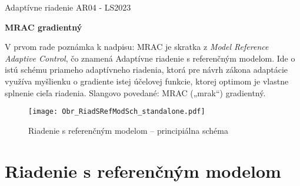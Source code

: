 \documentclass[a4paper, 10pt, ]{article}
\def\oznacenieCasti{AR04 - LS2023}
\begin{document}
\lstset{%
style=mystyle,
rangebeginprefix=\#\#\#\ cellB\ ,%
rangebeginsuffix=\ \#\#\#,%
rangeendprefix=\#\#\#\ cellE\ ,%
rangeendsuffix=\ \#\#\#,%
includerangemarker=false,
}





\fontsize{12pt}{22pt}\selectfont

\centerline{\textsf{Adaptívne riadenie} \hfill \textsf{\oznacenieCasti}}

\fontsize{18pt}{22pt}\selectfont





\begin{flushleft}
	\textbf{\textsf{MRAC gradientný}}
\end{flushleft}





\normalsize

\bigskip

{\hypersetup{hidelinks}

\tableofcontents

}

\bigskip

\vspace{18pt}






\noindent
V prvom rade poznámka k nadpisu: MRAC je skratka z \emph{Model Reference Adaptive Control}, čo znamená Adaptívne riadenie s referenčným modelom. Ide o istú schému priameho adaptívneho riadenia, ktorá pre návrh zákona adaptácie využíva myšlienku o gradiente istej účelovej funkcie, ktorej optimom je vlastne splnenie cieľa riadenia. Slangovo povedané: MRAC („mrak“) gradientný.








\begin{figure}[!b]
\centering

	\texttt{[image: Obr\_RiadSRefModSch\_standalone.pdf]}

	\caption{Riadenie s referenčným modelom -- principiálna schéma}
	\label{Riadenie s referenčným modelom --- principiálna schéma}

\end{figure}





\section{Riadenie s referenčným modelom}
\end{document}
